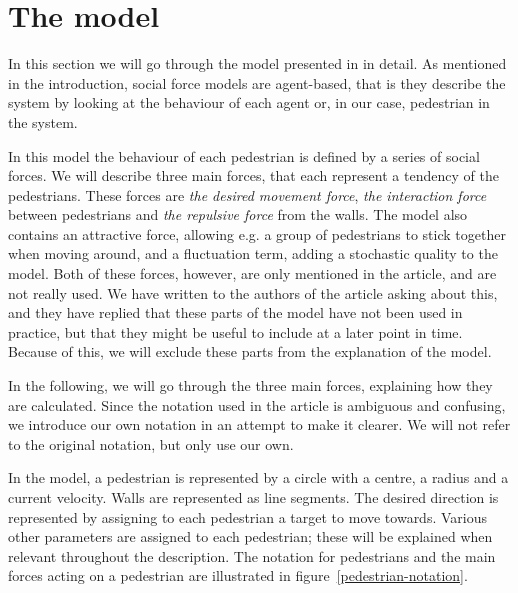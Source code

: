 \section{The model}
\label{sec:the-model}
In this section we will go through the model presented in \cite{self-org} in 
detail. As mentioned in the introduction, social force models are agent-based, 
that is they describe the system by looking at the behaviour of each agent or, 
in our case, pedestrian in the system.


In this model the behaviour of each pedestrian is defined by a series of social 
forces. We will describe three main forces, that each represent a tendency of 
the pedestrians. These forces are \emph{the desired movement force},  
\emph{the interaction force} between pedestrians and \emph{the repulsive 
force}  from the walls. The model also contains an attractive force, allowing 
e.g. a group of pedestrians to stick together when moving around, and a 
fluctuation term, adding a stochastic quality to the model. Both of these forces, 
however, are only mentioned in the article, and are not really used. We have 
written to the authors of the article asking about this, and they have replied 
that these parts of the model have not been used in practice, but that they 
might be useful to include at a later point in time.  Because of this, we will 
exclude these parts from the explanation of the model.

In the following, we will go through the three main forces, explaining how 
they are calculated. Since the notation used in the article is ambiguous and 
confusing, we introduce our own notation in an attempt to make it clearer. We 
will not refer to the original notation, but only use our own.

In the model, a pedestrian is represented by a circle with a centre, a radius 
and a current velocity. Walls are represented as line segments. The desired 
direction is represented by assigning to each pedestrian a target to move 
towards. Various other parameters are assigned to each pedestrian; these will 
be explained when relevant throughout the description. The notation for 
pedestrians and the main forces acting on a pedestrian are illustrated in  
figure~\ref{pedestrian-notation}.  

